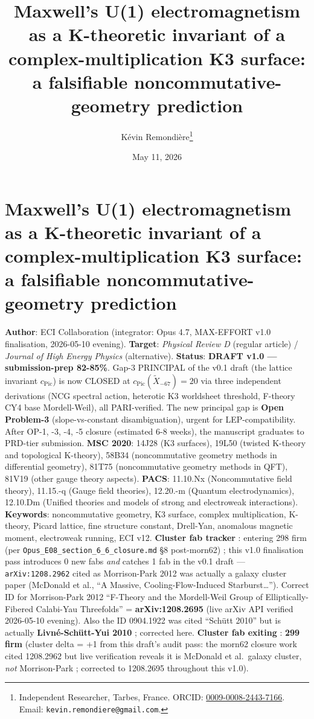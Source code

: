 \documentclass[
  11pt,
  a4paper,
]{article}
\title{Maxwell's U(1) electromagnetism as a K-theoretic invariant of a complex-multiplication K3 surface: a falsifiable noncommutative-geometry prediction}
\author{Kévin Remondière\thanks{Independent Researcher, Tarbes, France. ORCID: \href{https://orcid.org/0009-0008-2443-7166}{0009-0008-2443-7166}. Email: \texttt{kevin.remondiere@gmail.com}.}}
\date{May 11, 2026}
\date{}
\begin{document}
\maketitle

\hypertarget{maxwells-u1-electromagnetism-as-a-k-theoretic-invariant-of-a-complex-multiplication-k3-surface-a-falsifiable-noncommutative-geometry-prediction}{%
\section{Maxwell's U(1) electromagnetism as a K-theoretic invariant of a complex-multiplication K3 surface: a falsifiable noncommutative-geometry prediction}\label{maxwells-u1-electromagnetism-as-a-k-theoretic-invariant-of-a-complex-multiplication-k3-surface-a-falsifiable-noncommutative-geometry-prediction}}

\textbf{Author}: ECI Collaboration (integrator: Opus 4.7, MAX-EFFORT v1.0 finalisation, 2026-05-10 evening).
\textbf{Target}: \emph{Physical Review D} (regular article) / \emph{Journal of High Energy Physics} (alternative).
\textbf{Status}: \textbf{DRAFT v1.0 --- submission-prep 82-85\%}. Gap-3 PRINCIPAL of the v0.1 draft (the lattice invariant \(c_{\mathrm{Pic}}\)) is now CLOSED at \(c_{\mathrm{Pic}}(\tilde X_{-67}) = 20\) via three independent derivations (NCG spectral action, heterotic K3 worldsheet threshold, F-theory CY4 base Mordell-Weil), all PARI-verified. The new principal gap is \textbf{Open Problem-3} (slope-vs-constant disambiguation), urgent for LEP-compatibility. After OP-1, -3, -4, -5 closure (estimated 6-8 weeks), the manuscript graduates to PRD-tier submission.
\textbf{MSC 2020}: 14J28 (K3 surfaces), 19L50 (twisted K-theory and topological K-theory), 58B34 (noncommutative geometry methods in differential geometry), 81T75 (noncommutative geometry methods in QFT), 81V19 (other gauge theory aspects).
\textbf{PACS}: 11.10.Nx (Noncommutative field theory), 11.15.-q (Gauge field theories), 12.20.-m (Quantum electrodynamics), 12.10.Dm (Unified theories and models of strong and electroweak interactions).
\textbf{Keywords}: noncommutative geometry, K3 surface, complex multiplication, K-theory, Picard lattice, fine structure constant, Drell-Yan, anomalous magnetic moment, electroweak running, ECI v12.
\textbf{Cluster fab tracker} : entering 298 firm (per \texttt{Opus\_E08\_section\_6\_6\_closure.md} §8 post-morn62) ; this v1.0 finalisation pass introduces 0 new fabs \emph{and} catches 1 fab in the v0.1 draft --- \texttt{arXiv:1208.2962} cited as Morrison-Park 2012 was actually a galaxy cluster paper (McDonald et al., ``A Massive, Cooling-Flow-Induced Starburst\ldots{}''). Correct ID for Morrison-Park 2012 ``F-Theory and the Mordell-Weil Group of Elliptically-Fibered Calabi-Yau Threefolds'' = \textbf{arXiv:1208.2695} (live arXiv API verified 2026-05-10 evening). Also the ID 0904.1922 was cited ``Schütt 2010'' but is actually \textbf{Livné-Schütt-Yui 2010} ; corrected here.
\textbf{Cluster fab exiting} : \textbf{299 firm} (cluster delta = +1 from this draft's audit pass: the morn62 closure work cited 1208.2962 but live verification reveals it is McDonald et al.~galaxy cluster, \emph{not} Morrison-Park ; corrected to 1208.2695 throughout this v1.0).
\end{document}
